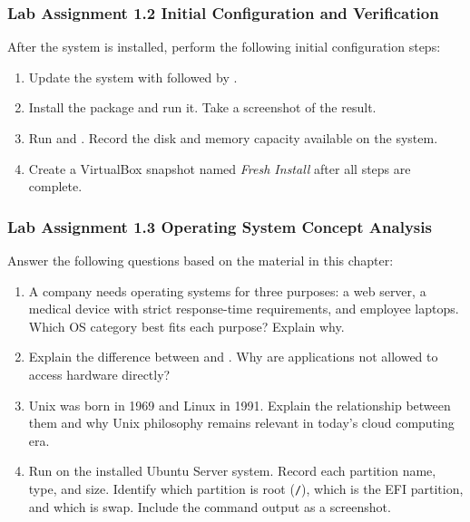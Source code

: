 \subsubsection*{Lab Assignment 1.2 Initial Configuration and Verification}
After the system is installed, perform the following initial configuration steps:
\begin{enumerate}
    \item Update the system with  followed by .
    \item Install the  package and run it. Take a screenshot of the result.
    \item Run  and . Record the disk and memory capacity available on the system.
    \item Create a VirtualBox snapshot named \textit{Fresh Install} after all steps are complete.
\end{enumerate}


\subsubsection*{Lab Assignment 1.3 Operating System Concept Analysis}
Answer the following questions based on the material in this chapter:
\begin{enumerate}
    \item A company needs operating systems for three purposes: a web server, a medical device with strict response-time requirements, and employee laptops. Which OS category best fits each purpose? Explain why.
    \item Explain the difference between  and . Why are applications not allowed to access hardware directly?
    \item Unix was born in 1969 and Linux in 1991. Explain the relationship between them and why Unix philosophy remains relevant in today's cloud computing era.
    \item Run  on the installed Ubuntu Server system. Record each partition name,  type, and size. Identify which partition is root (\texttt{/}), which is the EFI partition, and which is swap. Include the command output as a screenshot.
\end{enumerate}
